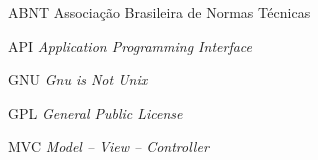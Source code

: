 
\begin{SingleSpace}

\begin{siglas}
\item[ABNT] Associação Brasileira de Normas Técnicas
\item[API] \textit{Application Programming Interface}
\item[GNU] \textit{Gnu is Not Unix}
\item[GPL] \textit{General Public License}
\item[MVC] \textit{Model -- View -- Controller}
\end{siglas}

\end{SingleSpace}
